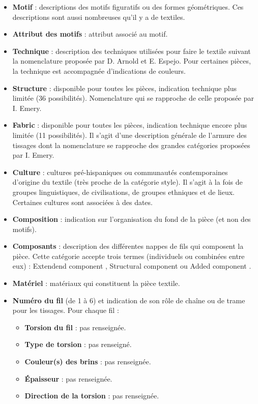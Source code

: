 \begin{citer}
\begin{itemize}
		\item  \textbf{Motif} : descriptions des motifs figuratifs ou des formes géométriques. Ces descriptions sont aussi nombreuses qu'il y a de textiles.
		\item  \textbf{Attribut des motifs} : attribut associé au motif.
		\item  \textbf{Technique} : description des techniques utilisées pour faire le textile suivant la nomenclature proposée par D. Arnold et E. Espejo. Pour certaines pièces, la technique est accompagnée d'indications de couleurs.
		\item  \textbf{Structure} : disponible pour toutes les pièces, indication technique plus limitée (36 possibilités). Nomenclature qui se rapproche de celle proposée par I. Emery. 
		\item  \textbf{\og Fabric \fg} : disponible pour toutes les pièces, indication technique encore plus limitée (11 possibilités). Il s'agit d'une description générale de l'armure des tissages dont la nomenclature se rapproche des grandes catégories proposées par I. Emery. 
		\item  \textbf{Culture} : cultures pré-hispaniques ou communautés contemporaines d'origine du textile (très proche de la catégorie style). Il s'agit à la fois de groupes linguistiques, de civilisations, de groupes ethniques et de lieux. Certaines cultures sont associées à des dates.
		\item  \textbf{Composition} : indication sur l'organisation du fond de la pièce (et non des motifs).		\item  \textbf{Composants} : description des différentes nappes de fils qui composent la pièce. Cette catégorie accepte trois termes (individuels ou combinées entre eux) : \og Extendend component \fg, \og Structural component \fg\: ou \og Added component \fg.
		\item  \textbf{Matériel} : matériaux qui constituent la pièce textile.
		\item  \textbf{Numéro du fil} (de 1 à 6) et indication de son rôle de chaîne ou de trame pour les tissages. Pour chaque fil : 
			\begin{itemize}
			\item  \textbf{Torsion du fil} : pas renseignée.
			\item \textbf{Type de torsion} : pas renseigné.
			\item  \textbf{Couleur(s) des brins} : pas renseignée.
			\item  \textbf{Épaisseur} : pas renseignée.
			\item  \textbf{Direction de la torsion} : pas renseignée.

\end{itemize}
\end{itemize}
\end{citer}
